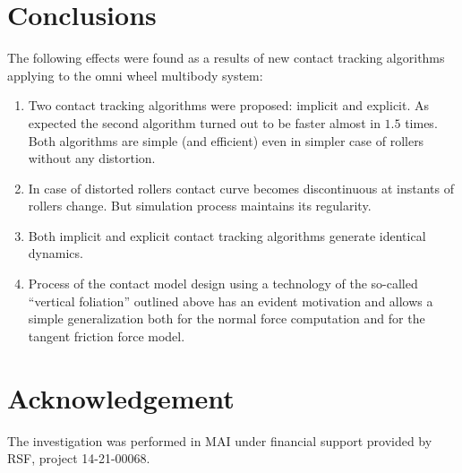 \documentclass{jsme-tj}
\begin{document}
\section{Conclusions}

The following effects were found as a results of new contact tracking 
algorithms applying to the omni wheel multibody system:
\begin{enumerate} 

\item
Two contact tracking algorithms were proposed: implicit and explicit. As
expected the second algorithm turned out to be faster almost in $1.5$ times. 
Both algorithms are simple (and efficient) even in simpler case of rollers 
without any distortion.

\item
In case of distorted rollers contact curve becomes discontinuous at instants
of rollers change. But simulation process maintains its regularity.

\item
Both implicit and explicit contact tracking algorithms generate identical 
dynamics.

\item
Process of the contact model design using a technology of the so-called 
``vertical foliation'' outlined above has an evident motivation and allows a 
simple generalization both for the normal force computation and for the tangent 
friction force model.

\end{enumerate} 

\section{Acknowledgement}

The investigation was performed in MAI under financial support provided by RSF, 
project 14-21-00068.
\end{document}
